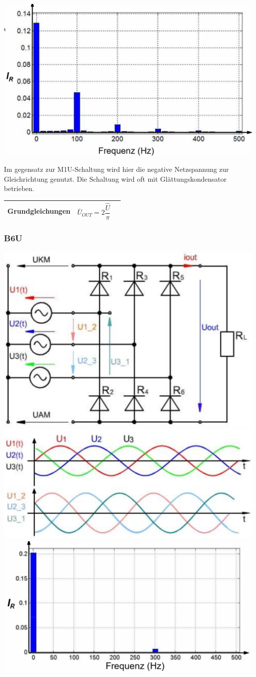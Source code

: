 \begin{minipage}{0.35\linewidth}
    \includegraphics[width=\linewidth]{images/UGB2OW}
\end{minipage}\newline

Im gegensatz zur M1U-Schaltung wird hier die negative Netzspannung zur Gleichrichtung genutzt.\newline
Die Schaltung wird oft mit Glättungskondensator betrieben.
\begin{longtable}{| p{} | p{} | p{} |} %
    \hline
    \textbf{Grundgleichungen}&
    \[ \bar{U}_{OUT} = 2\dfrac{\hat{U}}{\pi}\]&\\
    \hline   
\end{longtable}

\clearpage

\subsubsection{B6U}
\includegraphics[width=0.3\linewidth]{images/PrakUGB6}
\includegraphics[width=0.3\linewidth]{images/PrakUGB6Kl1}
\includegraphics[width=0.3\linewidth]{images/UGB6OW}\newline
\clearpage